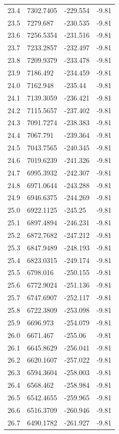 \begin{table}[H]
\begin{tabular}{llll}
23.4 & 7302.7405 & -229.554 & -9.81 \\
23.5 & 7279.687 & -230.535 & -9.81 \\
23.6 & 7256.5354 & -231.516 & -9.81 \\
23.7 & 7233.2857 & -232.497 & -9.81 \\
23.8 & 7209.9379 & -233.478 & -9.81 \\
23.9 & 7186.492 & -234.459 & -9.81 \\
24.0 & 7162.948 & -235.44 & -9.81 \\
24.1 & 7139.3059 & -236.421 & -9.81 \\
24.2 & 7115.5657 & -237.402 & -9.81 \\
24.3 & 7091.7274 & -238.383 & -9.81 \\
24.4 & 7067.791 & -239.364 & -9.81 \\
24.5 & 7043.7565 & -240.345 & -9.81 \\
24.6 & 7019.6239 & -241.326 & -9.81 \\
24.7 & 6995.3932 & -242.307 & -9.81 \\
24.8 & 6971.0644 & -243.288 & -9.81 \\
24.9 & 6946.6375 & -244.269 & -9.81 \\
25.0 & 6922.1125 & -245.25 & -9.81 \\
25.1 & 6897.4894 & -246.231 & -9.81 \\
25.2 & 6872.7682 & -247.212 & -9.81 \\
25.3 & 6847.9489 & -248.193 & -9.81 \\
25.4 & 6823.0315 & -249.174 & -9.81 \\
25.5 & 6798.016 & -250.155 & -9.81 \\
25.6 & 6772.9024 & -251.136 & -9.81 \\
25.7 & 6747.6907 & -252.117 & -9.81 \\
25.8 & 6722.3809 & -253.098 & -9.81 \\
25.9 & 6696.973 & -254.079 & -9.81 \\
26.0 & 6671.467 & -255.06 & -9.81 \\
26.1 & 6645.8629 & -256.041 & -9.81 \\
26.2 & 6620.1607 & -257.022 & -9.81 \\
26.3 & 6594.3604 & -258.003 & -9.81 \\
26.4 & 6568.462 & -258.984 & -9.81 \\
26.5 & 6542.4655 & -259.965 & -9.81 \\
26.6 & 6516.3709 & -260.946 & -9.81 \\
26.7 & 6490.1782 & -261.927 & -9.81 \\

\end{tabular}
\end{table}
